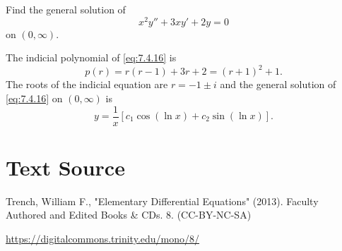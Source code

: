 \documentclass{ximera}
\begin{document}
\begin{example}\label{example:7.4.7}
  Find the general solution of
\begin{equation} \label{eq:7.4.16}
x^2y''+3xy'+2y=0
\end{equation}
on  $(0,\infty)$.
\begin{explanation}
The indicial polynomial of \eqref{eq:7.4.16} is
$$
p(r)=r(r-1)+3r+2=(r+1)^2+1.
$$
The roots of the indicial equation are $r=-1 \pm i$ and the general
solution of \eqref{eq:7.4.16} on $(0,\infty)$ is
$$
y=\frac{1}{x}\left[c_1\cos(\ln x)+c_2\sin(\ln x)\right].
$$
\end{explanation}
\end{example}

\section*{Text Source}
Trench, William F., "Elementary Differential Equations" (2013). Faculty Authored and Edited Books \& CDs. 8. (CC-BY-NC-SA)

\href{https://digitalcommons.trinity.edu/mono/8/}{https://digitalcommons.trinity.edu/mono/8/}
\end{document}
